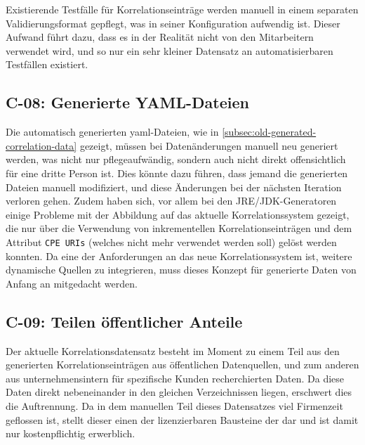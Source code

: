 Existierende Testfälle für Korrelationseinträge werden manuell in einem separaten Validierungsformat gepflegt, was in seiner Konfiguration aufwendig ist.
Dieser Aufwand führt dazu, dass es in der Realität nicht von den Mitarbeitern verwendet wird, und so nur ein sehr kleiner Datensatz an automatisierbaren Testfällen existiert.

\subsection{C-08: Generierte YAML-Dateien}\label{subsec:c-08-generated-correlation-data}


Die automatisch generierten \acrshort{yaml}-Dateien, wie in \autoref{subsec:old-generated-correlation-data} gezeigt, müssen bei Datenänderungen manuell neu generiert werden, was nicht nur pflegeaufwändig, sondern auch nicht direkt offensichtlich für eine dritte Person ist.
Dies könnte dazu führen, dass jemand die generierten Dateien manuell modifiziert, und diese Änderungen bei der nächsten Iteration verloren gehen.
Zudem haben sich, vor allem bei den JRE/JDK-Generatoren einige Probleme mit der Abbildung auf das aktuelle Korrelationssystem gezeigt, die nur über die Verwendung von inkrementellen Korrelationseinträgen und dem Attribut \texttt{CPE URIs} (welches nicht mehr verwendet werden soll) gelöst werden konnten.
Da eine der Anforderungen an das neue Korrelationssystem ist, weitere dynamische Quellen zu integrieren, muss dieses Konzept für generierte Daten von Anfang an mitgedacht werden.

\subsection{C-09: Teilen öffentlicher Anteile}\label{subsec:c-09-sharing-of-public-data}


Der aktuelle Korrelationsdatensatz besteht im Moment zu einem Teil aus den generierten Korrelationseinträgen aus öffentlichen Datenquellen, und zum anderen aus unternehmensintern für spezifische Kunden recherchierten Daten.
Da diese Daten direkt nebeneinander in den gleichen Verzeichnissen liegen, erschwert dies die Auftrennung.
Da in dem manuellen Teil dieses Datensatzes viel Firmenzeit geflossen ist, stellt dieser einen der lizenzierbaren Bausteine der \metaeffektsp dar und ist damit nur kostenpflichtig erwerblich.

